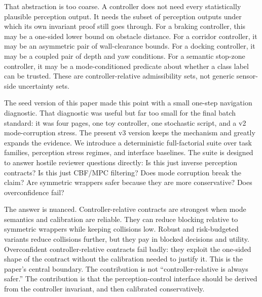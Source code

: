 \documentclass{article}
\begin{document}
That abstraction is too coarse. A controller does not need every statistically plausible perception output. It needs the subset of perception outputs under which its own invariant proof still goes through. For a braking controller, this may be a one-sided lower bound on obstacle distance. For a corridor controller, it may be an asymmetric pair of wall-clearance bounds. For a docking controller, it may be a coupled pair of depth and yaw conditions. For a semantic stop-zone controller, it may be a mode-conditioned predicate about whether a class label can be trusted. These are controller-relative admissibility sets, not generic sensor-side uncertainty sets.

The seed version of this paper made this point with a small one-step navigation diagnostic. That diagnostic was useful but far too small for the final batch standard: it was four pages, one toy controller, one stochastic script, and a v2 mode-corruption stress. The present v3 version keeps the mechanism and greatly expands the evidence. We introduce a deterministic full-factorial suite over task families, perception stress regimes, and interface baselines. The suite is designed to answer hostile reviewer questions directly: Is this just inverse perception contracts? Is this just CBF/MPC filtering? Does mode corruption break the claim? Are symmetric wrappers safer because they are more conservative? Does overconfidence fail?

The answer is nuanced. Controller-relative contracts are strongest when mode semantics and calibration are reliable. They can reduce blocking relative to symmetric wrappers while keeping collisions low. Robust and risk-budgeted variants reduce collisions further, but they pay in blocked decisions and utility. Overconfident controller-relative contracts fail badly: they exploit the one-sided shape of the contract without the calibration needed to justify it. This is the paper's central boundary. The contribution is not ``controller-relative is always safer.'' The contribution is that the perception-control interface should be derived from the controller invariant, and then calibrated conservatively.
\end{document}
